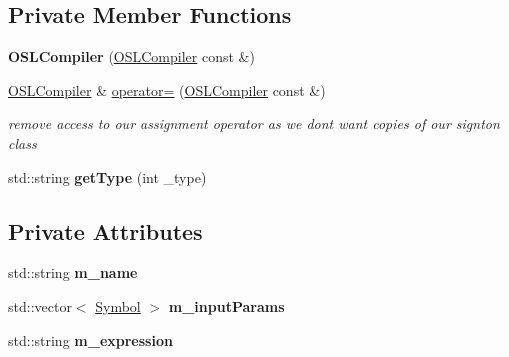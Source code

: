 \subsection*{Private Member Functions}
\begin{DoxyCompactItemize}
\item 
\hypertarget{class_o_s_l_compiler_a0816150c81b4be677057c74201ffd013}{{\bfseries O\-S\-L\-Compiler} (\hyperlink{class_o_s_l_compiler}{O\-S\-L\-Compiler} const \&)}\label{class_o_s_l_compiler_a0816150c81b4be677057c74201ffd013}

\item 
\hypertarget{class_o_s_l_compiler_a05d8e7353844cb8e628cf210184c6d45}{\hyperlink{class_o_s_l_compiler}{O\-S\-L\-Compiler} \& \hyperlink{class_o_s_l_compiler_a05d8e7353844cb8e628cf210184c6d45}{operator=} (\hyperlink{class_o_s_l_compiler}{O\-S\-L\-Compiler} const \&)}\label{class_o_s_l_compiler_a05d8e7353844cb8e628cf210184c6d45}

\begin{DoxyCompactList}\small\item\em remove access to our assignment operator as we dont want copies of our signton class \end{DoxyCompactList}\item 
\hypertarget{class_o_s_l_compiler_a480f3dd4b8d166b8d7fbafc6833cf146}{std\-::string {\bfseries get\-Type} (int \-\_\-type)}\label{class_o_s_l_compiler_a480f3dd4b8d166b8d7fbafc6833cf146}

\end{DoxyCompactItemize}
\subsection*{Private Attributes}
\begin{DoxyCompactItemize}
\item 
\hypertarget{class_o_s_l_compiler_a6c6afdea5fd226965bce2178e95c2e5c}{std\-::string {\bfseries m\-\_\-name}}\label{class_o_s_l_compiler_a6c6afdea5fd226965bce2178e95c2e5c}

\item 
\hypertarget{class_o_s_l_compiler_a012d421fb537d8a66786ff1745a2248b}{std\-::vector$<$ \hyperlink{struct_o_s_l_compiler_1_1_symbol}{Symbol} $>$ {\bfseries m\-\_\-input\-Params}}\label{class_o_s_l_compiler_a012d421fb537d8a66786ff1745a2248b}

\item 
\hypertarget{class_o_s_l_compiler_a3260425fc1cd03a8ec287ed39cfb07d0}{std\-::string {\bfseries m\-\_\-expression}}\label{class_o_s_l_compiler_a3260425fc1cd03a8ec287ed39cfb07d0}

\end{DoxyCompactItemize}
